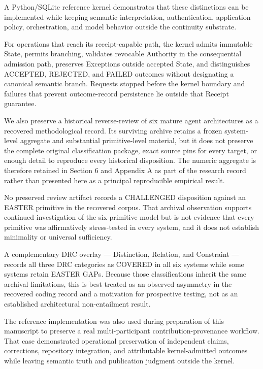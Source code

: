 \documentclass[11pt]{article}
\begin{document}
A Python/SQLite reference kernel demonstrates that these distinctions can be implemented while keeping semantic interpretation, authentication, application policy, orchestration, and model behavior outside the continuity substrate.

For operations that reach its receipt-capable path, the kernel admits immutable State, permits branching, validates revocable Authority in the consequential admission path, preserves Exceptions outside accepted State, and distinguishes ACCEPTED, REJECTED, and FAILED outcomes without designating a canonical semantic branch. Requests stopped before the kernel boundary and failures that prevent outcome-record persistence lie outside that Receipt guarantee.

We also preserve a historical reverse-review of six mature agent architectures as a recovered methodological record. Its surviving archive retains a frozen system-level aggregate and substantial primitive-level material, but it does not preserve the complete original classification package, exact source pins for every target, or enough detail to reproduce every historical disposition. The numeric aggregate is therefore retained in Section 6 and Appendix A as part of the research record rather than presented here as a principal reproducible empirical result.

No preserved review artifact records a CHALLENGED disposition against an EASTER primitive in the recovered corpus. That archival observation supports continued investigation of the six-primitive model but is not evidence that every primitive was affirmatively stress-tested in every system, and it does not establish minimality or universal sufficiency.

A complementary DRC overlay --- Distinction, Relation, and Constraint --- records all three DRC categories as COVERED in all six systems while some systems retain EASTER GAPs. Because those classifications inherit the same archival limitations, this is best treated as an observed asymmetry in the recovered coding record and a motivation for prospective testing, not as an established architectural non-entailment result.

The reference implementation was also used during preparation of this manuscript to preserve a real multi-participant contribution-provenance workflow. That case demonstrated operational preservation of independent claims, corrections, repository integration, and attributable kernel-admitted outcomes while leaving semantic truth and publication judgment outside the kernel.
\end{document}
